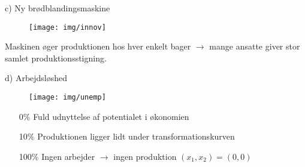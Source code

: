 \begin{frame}{c) Ny brødblandingsmaskine}

    \begin{figure}
    \centering
        \texttt{[image: img/innov]}
  \end{figure}

Maskinen øger produktionen hos hver enkelt bager $\rightarrow$ mange ansatte giver stor samlet produktionsstigning.

\end{frame}


\begin{frame}{d) Arbejdsløshed}

    \begin{figure}
    \centering
        \texttt{[image: img/unemp]}
  \end{figure}

  \begin{itemize}
      \item[0\%] Fuld udnyttelse af potentialet i økonomien
      \item[10\%] Produktionen ligger lidt under transformationskurven
      \item[100\%] Ingen arbejder $\rightarrow$ ingen produktion $(x_1,x_2) = (0,0)$
  \end{itemize}

\end{frame}
